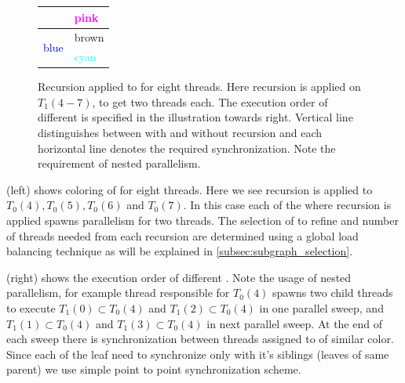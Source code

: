 \begin{figure}[H]
\begin{minipage}[c]{0.4\textwidth}
\begin{tabular}{l|l}
	       	   \cmidrule(lr){2-2}
	       		& {\textcolor{magenta}{pink}}\\
	       		\midrule
	       	   \multirow{2}{*}{\textcolor{blue}{blue}} & {\textcolor{carmine}{brown}}\\
	       	   \cmidrule(lr){2-2}
	       	   & {\textcolor{cyan}{cyan}}\\
	       	   \bottomrule
	       	\end{tabular}
       		\caption{Recursion applied to \stex for eight threads. Here recursion is applied on \levelGroups $T_1(4-7)$, to get two threads each. The execution order of different \levelGroup is specified in the illustration towards right. Vertical line distinguishes between \levelGroups with and without recursion and each horizontal line denotes the required synchronization. Note the requirement of nested parallelism.}
       		\label{fig:rec_2d-7pt_graph}
       	\end{minipage}
       \end{figure}
     
      (left) shows \DTWO coloring of \stex  for eight threads. Here we see recursion is applied to \levelGroups $T_0(4),T_0(5),T_0(6)$ and $T_0(7)$. In this case each of the \levelGroups where recursion is applied spawns parallelism for two threads. The selection of \levelGroups to refine and number of threads needed from each recursion are determined using a global load balancing technique as will be explained in \cref{subsec:subgraph_selection}.
     
       (right) shows the execution order of different \levelGroups. Note the usage of nested parallelism, \ie for example thread responsible for $T_0(4)$ spawns two child threads to execute $T_1(0) \subset T_0(4)$ and $T_1(2) \subset T_0(4)$ in one parallel sweep, and $T_1(1) \subset T_0(4)$ and $T_1(3) \subset T_0(4)$ in next parallel sweep. At the end of each sweep there is synchronization between threads assigned to \levelGroup of similar color. Since each of the leaf need to synchronize only with it's siblings (leaves of same parent)  we use simple point to point synchronization scheme. 
          
       
